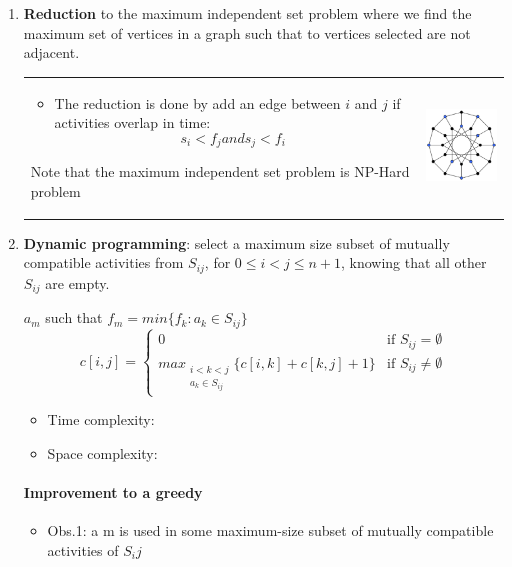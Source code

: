 \begin{enumerate}
    \item \textbf{Reduction} to the maximum independent set problem where 
        we find the maximum set of vertices in a graph such that
        to vertices selected are not adjacent.

        \begin{tabular}{m{10cm}m{3cm}}
            \begin{itemize}
                \item The reduction is done by add an edge between $i$ and $j$ if
                    activities overlap in time: 
                    $$s_i < f_j and s_j < f_i$$ 
            \end{itemize}
            Note that the maximum independent set problem is NP-Hard problem
            &
            \includegraphics[width=3cm]{img/independant}
        \end{tabular}


    \item \textbf{Dynamic programming}: select a maximum size subset of mutually
        compatible activities from $S_{ij}$, for $0 \leq i < j \leq n+1$,
        knowing that all other $S_{ij}$ are empty.

        $a_m$ such that $f_m = min\{f_k: a_k \in S_{ij}\}$
        \[
            c[i, j] = 
            \begin{cases} 
                0 & \text{if } S_{ij} = \emptyset \\
                max_{\substack{i<k<j \\ a_k \in S_{ij}}} \{c[i, k] + c[k, j] + 1\}  & \text{if } S_{ij} \neq \emptyset
            \end{cases}
        \]
        \begin{itemize}
            \item Time complexity: 
            \item Space complexity: 
        \end{itemize}

        \paragraph{Improvement to a greedy}
        \begin{itemize}
            \item Obs.1: a m is used in some maximum-size subset of
                mutually compatible activities of $S_ij$


\end{itemize}
\end{enumerate}
